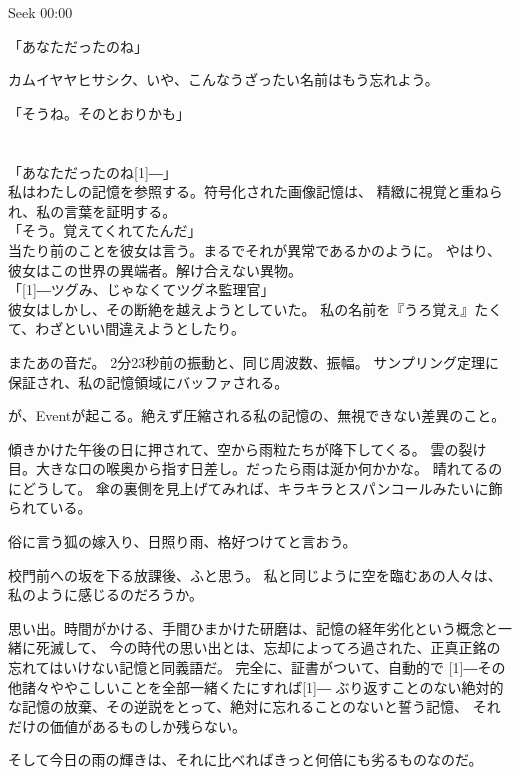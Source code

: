 \documentclass[../NenokuniMain]{subfiles}
\begin{document}
Seek 00:00

「あなただったのね」

カムイヤヤヒサシク、いや、こんなうざったい名前はもう忘れよう。

「そうね。そのとおりかも」

\section{}

「あなただったのね\scalebox{2}[1]{―}」\\
私はわたしの記憶を参照する。符号化された画像記憶は、
精緻に視覚と重ねられ、私の言葉を証明する。\\
「そう。覚えてくれてたんだ」\\
当たり前のことを彼女は言う。まるでそれが異常であるかのように。
やはり、彼女はこの世界の異端者。解け合えない異物。\\
「\scalebox{2}[1]{―}ツグみ、じゃなくてツグネ監理官」\\
彼女はしかし、その断絶を越えようとしていた。
私の名前を『うろ覚え』たくて、わざといい間違えようとしたり。

またあの音だ。
2分23秒前の振動と、同じ周波数、振幅。
サンプリング定理に保証され、私の記憶領域にバッファされる。

が、Eventが起こる。絶えず圧縮される私の記憶の、無視できない差異のこと。



傾きかけた午後の日に押されて、空から雨粒たちが降下してくる。
雲の裂け目。大きな口の喉奥から指す日差し。だったら雨は涎か何かかな。
晴れてるのにどうして。
傘の裏側を見上げてみれば、キラキラとスパンコールみたいに飾られている。

俗に言う狐の嫁入り、日照り雨、格好つけてと言おう。

校門前への坂を下る放課後、ふと思う。
私と同じように空を臨むあの人々は、私のように感じるのだろうか。

思い出。時間がかける、手間ひまかけた研磨は、記憶の経年劣化という概念と一緒に死滅して、
今の時代の思い出とは、忘却によってろ過された、正真正銘の忘れてはいけない記憶と同義語だ。
完全に、証書がついて、自動的で
\scalebox{2}[1]{―}その他諸々ややこしいことを全部一緒くたにすれば\scalebox{2}[1]{―}
ぶり返すことのない絶対的な記憶の放棄、その逆説をとって、絶対に忘れることのないと誓う記憶、
それだけの価値があるものしか残らない。

そして今日の雨の輝きは、それに比べればきっと何倍にも劣るものなのだ。
\end{document}
